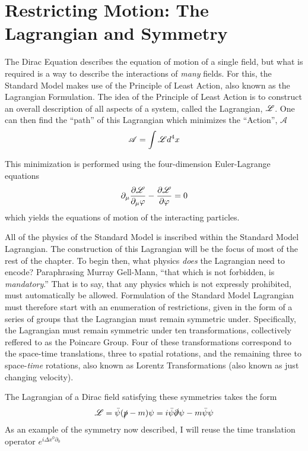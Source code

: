 \section{Restricting Motion: The Lagrangian and Symmetry}
    
    The Dirac Equation describes the equation of motion of a single field,
        but what is required is a way to describe the interactions of \textit{many} fields.
    For this, the Standard Model makes use of the Principle of Least Action,
        also known as the Lagrangian Formulation\cite{Halzen_book}.
    The idea of the Principle of Least Action is to construct an overall description of all aspects of a system,
        called the Lagrangian, $\mathscr{L}$.
    One can then find the ``path'' of this Lagrangian which minimizes the ``Action'', $\mathscr{A}$
    \begin{equation} %
        \mathscr{A} = \int \Lag d^4 x
    \end{equation}

    This minimization is performed using the four-dimension Euler-Lagrange equations
    \begin{equation}
        \partial_\mu \frac{\partial \mathscr{L}}{\partial_\mu \varphi } - \frac{\partial \mathscr{L}}{\partial \varphi} = 0
    \end{equation}
    which yields the equations of motion of the interacting particles.

    All of the physics of the Standard Model is inscribed within the Standard Model Lagrangian.
    The construction of this Lagrangian will be the focus of most of the rest of the chapter.
    To begin then, what physics \textit{does} the Lagrangian need to encode?
    Paraphrasing Murray Gell-Mann, ``that which is not forbidden, is \textit{mandatory}.''
    That is to say, that any physics which is not expressly prohibited, must automatically be allowed.
    Formulation of the Standard Model Lagrangian must therefore start with an enumeration of restrictions,
        given in the form of a series of groups that the Lagrangian must remain symmetric under.
    Specifically, the Lagrangian must remain symmetric under ten transformations,
        collectively reffered to as the Poincare Group.
    Four of these transformations correspond to the space-time translations,
        three to spatial rotations, and the remaining three to space-\textit{time} rotations,
        also known as Lorentz Transformations (also known as just changing velocity).

    The Lagrangian of a Dirac field satisfying these symmetries takes the form
    \begin{equation} \label{eq:basic_fermionL}
        \mathscr{L} = \bar{\psi} (\slashed{p} - m) \psi = i \bar{\psi} \slashed{\partial} \psi - m \bar{\psi} \psi
    \end{equation}
    As an example of the symmetry now described, I will reuse the time translation operator $e^{i\Delta x^0 \partial_0}$

